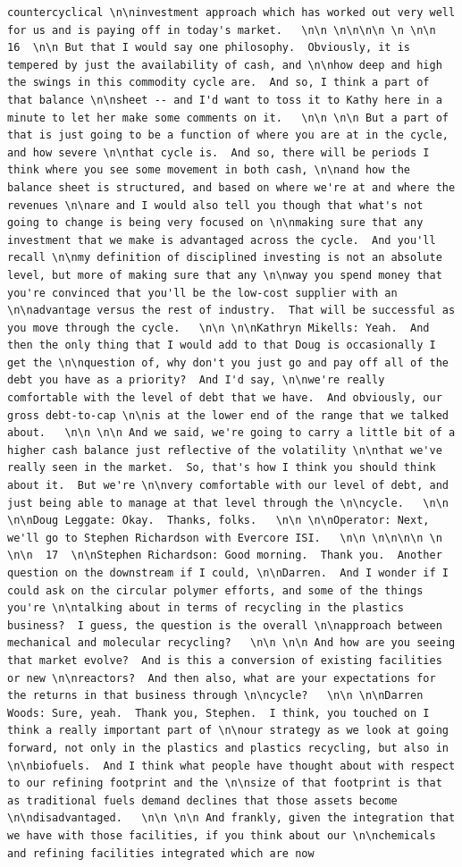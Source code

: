 \documentclass[
  letterpaper,
  DIV=11,
  numbers=noendperiod]{scrreprt}
\begin{document}
\begin{verbatim}
countercyclical \n\ninvestment approach which has worked out very well for us and is paying off in today's market.   \n\n \n\n\n\n \n \n\n  16  \n\n But that I would say one philosophy.  Obviously, it is tempered by just the availability of cash, and \n\nhow deep and high the swings in this commodity cycle are.  And so, I think a part of that balance \n\nsheet -- and I'd want to toss it to Kathy here in a minute to let her make some comments on it.   \n\n \n\n But a part of that is just going to be a function of where you are at in the cycle, and how severe \n\nthat cycle is.  And so, there will be periods I think where you see some movement in both cash, \n\nand how the balance sheet is structured, and based on where we're at and where the revenues \n\nare and I would also tell you though that what's not going to change is being very focused on \n\nmaking sure that any investment that we make is advantaged across the cycle.  And you'll recall \n\nmy definition of disciplined investing is not an absolute level, but more of making sure that any \n\nway you spend money that you're convinced that you'll be the low-cost supplier with an \n\nadvantage versus the rest of industry.  That will be successful as you move through the cycle.   \n\n \n\nKathryn Mikells: Yeah.  And then the only thing that I would add to that Doug is occasionally I get the \n\nquestion of, why don't you just go and pay off all of the debt you have as a priority?  And I'd say, \n\nwe're really comfortable with the level of debt that we have.  And obviously, our gross debt-to-cap \n\nis at the lower end of the range that we talked about.   \n\n \n\n And we said, we're going to carry a little bit of a higher cash balance just reflective of the volatility \n\nthat we've really seen in the market.  So, that's how I think you should think about it.  But we're \n\nvery comfortable with our level of debt, and just being able to manage at that level through the \n\ncycle.   \n\n \n\nDoug Leggate: Okay.  Thanks, folks.   \n\n \n\nOperator: Next, we'll go to Stephen Richardson with Evercore ISI.   \n\n \n\n\n\n \n \n\n  17  \n\nStephen Richardson: Good morning.  Thank you.  Another question on the downstream if I could, \n\nDarren.  And I wonder if I could ask on the circular polymer efforts, and some of the things you're \n\ntalking about in terms of recycling in the plastics business?  I guess, the question is the overall \n\napproach between mechanical and molecular recycling?   \n\n \n\n And how are you seeing that market evolve?  And is this a conversion of existing facilities or new \n\nreactors?  And then also, what are your expectations for the returns in that business through \n\ncycle?   \n\n \n\nDarren Woods: Sure, yeah.  Thank you, Stephen.  I think, you touched on I think a really important part of \n\nour strategy as we look at going forward, not only in the plastics and plastics recycling, but also in \n\nbiofuels.  And I think what people have thought about with respect to our refining footprint and the \n\nsize of that footprint is that as traditional fuels demand declines that those assets become \n\ndisadvantaged.   \n\n \n\n And frankly, given the integration that we have with those facilities, if you think about our \n\nchemicals and refining facilities integrated which are now 
\end{verbatim}
\end{document}

